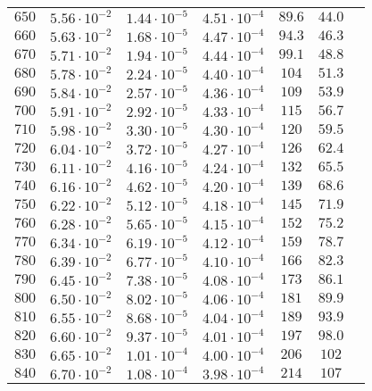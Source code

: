 \begin{table}
\begin{tabular}{lcccccc}
$650 $&$ 5.56\cdot 10^{-2} $&$ 1.44\cdot 10^{-5} $&$ 4.51\cdot 10^{-4} $&$ 89.6 $&$ 44.0 $\\
$660 $&$ 5.63\cdot 10^{-2} $&$ 1.68\cdot 10^{-5} $&$ 4.47\cdot 10^{-4} $&$ 94.3 $&$ 46.3 $\\
$670 $&$ 5.71\cdot 10^{-2} $&$ 1.94\cdot 10^{-5} $&$ 4.44\cdot 10^{-4} $&$ 99.1 $&$ 48.8 $\\
$680 $&$ 5.78\cdot 10^{-2} $&$ 2.24\cdot 10^{-5} $&$ 4.40\cdot 10^{-4} $&$ 104 $&$ 51.3  $\\
$690 $&$ 5.84\cdot 10^{-2} $&$ 2.57\cdot 10^{-5} $&$ 4.36\cdot 10^{-4} $&$ 109 $&$ 53.9  $\\
$700 $&$ 5.91\cdot 10^{-2} $&$ 2.92\cdot 10^{-5} $&$ 4.33\cdot 10^{-4} $&$ 115 $&$ 56.7  $\\
$710 $&$ 5.98\cdot 10^{-2} $&$ 3.30\cdot 10^{-5} $&$ 4.30\cdot 10^{-4} $&$ 120 $&$ 59.5  $\\
$720 $&$ 6.04\cdot 10^{-2} $&$ 3.72\cdot 10^{-5} $&$ 4.27\cdot 10^{-4} $&$ 126 $&$ 62.4  $\\
$730 $&$ 6.11\cdot 10^{-2} $&$ 4.16\cdot 10^{-5} $&$ 4.24\cdot 10^{-4} $&$ 132 $&$ 65.5  $\\
$740 $&$ 6.16\cdot 10^{-2} $&$ 4.62\cdot 10^{-5} $&$ 4.20\cdot 10^{-4} $&$ 139 $&$ 68.6  $\\
$750 $&$ 6.22\cdot 10^{-2} $&$ 5.12\cdot 10^{-5} $&$ 4.18\cdot 10^{-4} $&$ 145 $&$ 71.9  $\\
$760 $&$ 6.28\cdot 10^{-2} $&$ 5.65\cdot 10^{-5} $&$ 4.15\cdot 10^{-4} $&$ 152 $&$ 75.2  $\\
$770 $&$ 6.34\cdot 10^{-2} $&$ 6.19\cdot 10^{-5} $&$ 4.12\cdot 10^{-4} $&$ 159 $&$ 78.7  $\\
$780 $&$ 6.39\cdot 10^{-2} $&$ 6.77\cdot 10^{-5} $&$ 4.10\cdot 10^{-4} $&$ 166 $&$ 82.3  $\\
$790 $&$ 6.45\cdot 10^{-2} $&$ 7.38\cdot 10^{-5} $&$ 4.08\cdot 10^{-4} $&$ 173 $&$ 86.1  $\\
$800 $&$ 6.50\cdot 10^{-2} $&$ 8.02\cdot 10^{-5} $&$ 4.06\cdot 10^{-4} $&$ 181 $&$ 89.9  $\\
$810 $&$ 6.55\cdot 10^{-2} $&$ 8.68\cdot 10^{-5} $&$ 4.04\cdot 10^{-4} $&$ 189 $&$ 93.9  $\\
$820 $&$ 6.60\cdot 10^{-2} $&$ 9.37\cdot 10^{-5} $&$ 4.01\cdot 10^{-4} $&$ 197 $&$ 98.0  $\\
$830 $&$ 6.65\cdot 10^{-2} $&$ 1.01\cdot 10^{-4} $&$ 4.00\cdot 10^{-4} $&$ 206 $&$ 102   $\\
$840 $&$ 6.70\cdot 10^{-2} $&$ 1.08\cdot 10^{-4} $&$ 3.98\cdot 10^{-4} $&$ 214 $&$ 107   $\\

\end{tabular}
\end{table}
